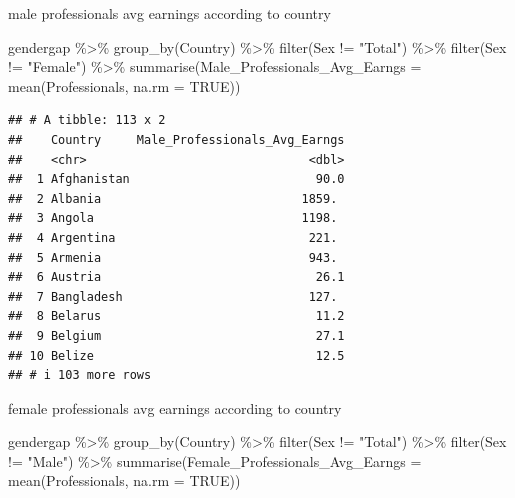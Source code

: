 \documentclass[
]{article}
\newenvironment{Shaded}{\begin{snugshade}}{\end{snugshade}}
\newcommand{\AttributeTok}[1]{\textcolor[rgb]{0.77,0.63,0.00}{#1}}
\newcommand{\ConstantTok}[1]{\textcolor[rgb]{0.00,0.00,0.00}{#1}}
\newcommand{\FunctionTok}[1]{\textcolor[rgb]{0.00,0.00,0.00}{#1}}
\newcommand{\NormalTok}[1]{#1}
\newcommand{\SpecialCharTok}[1]{\textcolor[rgb]{0.00,0.00,0.00}{#1}}
\newcommand{\StringTok}[1]{\textcolor[rgb]{0.31,0.60,0.02}{#1}}
\begin{document}
male professionals avg earnings according to country

\begin{Shaded}
\begin{Highlighting}[]
\NormalTok{gendergap }\SpecialCharTok{\%\textgreater{}\%}
  \FunctionTok{group\_by}\NormalTok{(Country) }\SpecialCharTok{\%\textgreater{}\%} 
   \FunctionTok{filter}\NormalTok{(Sex }\SpecialCharTok{!=} \StringTok{"Total"}\NormalTok{) }\SpecialCharTok{\%\textgreater{}\%}
  \FunctionTok{filter}\NormalTok{(Sex }\SpecialCharTok{!=} \StringTok{"Female"}\NormalTok{) }\SpecialCharTok{\%\textgreater{}\%}
  \FunctionTok{summarise}\NormalTok{(}\AttributeTok{Male\_Professionals\_Avg\_Earngs =} \FunctionTok{mean}\NormalTok{(Professionals, }\AttributeTok{na.rm =} \ConstantTok{TRUE}\NormalTok{))}
\end{Highlighting}
\end{Shaded}

\begin{verbatim}
## # A tibble: 113 x 2
##    Country     Male_Professionals_Avg_Earngs
##    <chr>                               <dbl>
##  1 Afghanistan                          90.0
##  2 Albania                            1859. 
##  3 Angola                             1198. 
##  4 Argentina                           221. 
##  5 Armenia                             943. 
##  6 Austria                              26.1
##  7 Bangladesh                          127. 
##  8 Belarus                              11.2
##  9 Belgium                              27.1
## 10 Belize                               12.5
## # i 103 more rows
\end{verbatim}

female professionals avg earnings according to country

\begin{Shaded}
\begin{Highlighting}[]
\NormalTok{gendergap }\SpecialCharTok{\%\textgreater{}\%}
  \FunctionTok{group\_by}\NormalTok{(Country) }\SpecialCharTok{\%\textgreater{}\%} 
   \FunctionTok{filter}\NormalTok{(Sex }\SpecialCharTok{!=} \StringTok{"Total"}\NormalTok{) }\SpecialCharTok{\%\textgreater{}\%}
  \FunctionTok{filter}\NormalTok{(Sex }\SpecialCharTok{!=} \StringTok{"Male"}\NormalTok{) }\SpecialCharTok{\%\textgreater{}\%}
  \FunctionTok{summarise}\NormalTok{(}\AttributeTok{Female\_Professionals\_Avg\_Earngs =} \FunctionTok{mean}\NormalTok{(Professionals, }\AttributeTok{na.rm =} \ConstantTok{TRUE}\NormalTok{))}
\end{Highlighting}
\end{Shaded}
\end{document}
